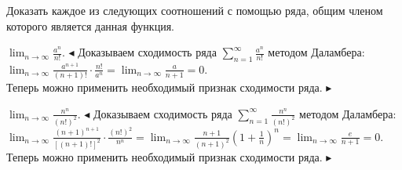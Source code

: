 \documentclass[a5paper,10pt]{article}
\begin{document}
\medskip
\noindent Доказать каждое из следующих соотношений с помощью ряда, общим
членом которого является данная функция.

\medskip
{} $\displaystyle\lim_{n\to\infty}\frac{a^n}{n!}$.
$\blacktriangleleft$ Доказываем сходимость ряда
$\displaystyle\sum_{n=1}^{\infty}\frac{a^n}{n!}$ методом Даламбера:\\
$\displaystyle\lim_{n\to\infty}\frac{a^{n+1}}{(n+1)!}\cdot\frac{n!}{a^n}=
\lim_{n\to\infty}\frac{a}{n+1}=0$.\\
Теперь можно применить необходимый признак сходимости ряда.
$\blacktriangleright$

\medskip
{} $\displaystyle\lim_{n\to\infty}\frac{n^n}{(n!)^2}$.
$\blacktriangleleft$ Доказываем сходимость ряда
$\displaystyle\sum_{n=1}^{\infty}\frac{n^n}{(n!)^2}$ методом Даламбера:\\
$\displaystyle\lim_{n\to\infty}\frac{(n+1)^{n+1}}{[(n+1)!]^2}\cdot\frac{(n!)^2}{n^n}=
\lim_{n\to\infty}\frac{n+1}{(n+1)^2}\left(1+\frac1n\right)^n=
\lim_{n\to\infty}\frac{e}{n+1}=0$.\\
Теперь можно применить необходимый признак сходимости ряда.
$\blacktriangleright$

\bigskip
{}
\end{document}
